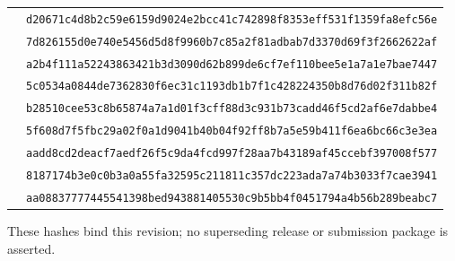 \documentclass[10pt]{article}
\newcommand{\sha}[1]{\nolinkurl{#1}}
\begin{document}
\begin{longtable}{L{.55\linewidth}L{.39\linewidth}}
& \sha{d20671c4d8b2c59e6159d9024e2bcc41c742898f8353eff531f1359fa8efc56e}\\
& \sha{7d826155d0e740e5456d5d8f9960b7c85a2f81adbab7d3370d69f3f2662622af}\\
& \sha{a2b4f111a52243863421b3d3090d62b899de6cf7ef110bee5e1a7a1e7bae7447}\\
& \sha{5c0534a0844de7362830f6ec31c1193db1b7f1c428224350b8d76d02f311b82f}\\
& \sha{b28510cee53c8b65874a7a1d01f3cff88d3c931b73cadd46f5cd2af6e7dabbe4}\\
& \sha{5f608d7f5fbc29a02f0a1d9041b40b04f92ff8b7a5e59b411f6ea6bc66c3e3ea}\\
& \sha{aadd8cd2deacf7aedf26f5c9da4fcd997f28aa7b43189af45ccebf397008f577}\\
& \sha{8187174b3e0c0b3a0a55fa32595c211811c357dc223ada7a74b3033f7cae3941}\\
& \sha{aa08837777445541398bed943881405530c9b5bb4f0451794a4b56b289beabc7}\\
\bottomrule
\end{longtable}
\endgroup

These hashes bind this revision; no superseding release or submission package
is asserted.
\end{document}

